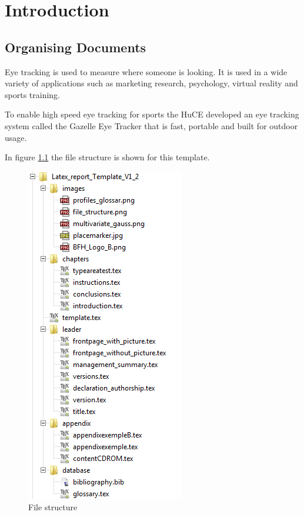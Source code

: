 \chapter{Introduction}
\label{chap:introduction}



\nocite{kopka:band1}
\nocite{raichle:bibtex_programmierung}
\nocite{MiKTeX}
\nocite{KOMA}
\nocite{TeXnicCenter}
\nocite{Marti06}
\nocite{Erbsland08}
\nocite{juergens:einfuehrung}
\nocite{juergens:fortgeschritten}

\section{Organising Documents}
\label{sec:einleitung_aufbau}
Eye tracking is used to measure where someone is looking. It is used in a wide variety of applications such as marketing research, psychology, virtual reality and sports training. 

To enable high speed eye tracking for sports the HuCE developed an eye tracking system called the Gazelle Eye Tracker that is fast, portable and built for outdoor usage. 

In figure \ref{fig:file_structure} the file structure is shown for this template.

\begin{figure}[H]
	\centering
		\includegraphics[scale=0.85]{images/file_structure.png}
	\caption{File structure}
	\label{fig:file_structure}
\end{figure}

